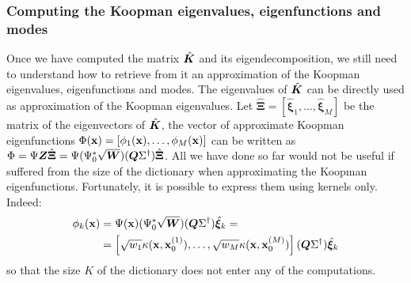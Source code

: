 \subsubsection{Computing the Koopman eigenvalues, eigenfunctions and modes}
Once we have computed the matrix $\hat{\vb*{K}}$ and its eigendecomposition, we still need to understand how to retrieve from it an approximation of the Koopman eigenvalues, eigenfunctions and modes. The eigenvalues of $\hat{\vb*{K}}$ can be directly used as approximation of the Koopman eigenvalues. Let $\hat{\bm{\Xi}} = \left[\hat{\bm{\xi}}_1,\dots,\hat{\bm{\xi}}_M\right]$ be the matrix of the eigenvectors of $\hat{\vb*{K}}$, the vector of approximate Koopman eigenfunctions $\Phi(\vb{x}) = \left[\phi_1(\vb{x}), \dots, \phi_M(\vb{x})\right]$ can be written as $\Phi = \Psi\vb*{Z}\hat{\bm{\Xi}} = \Psi (\Psi_0^*\sqrt{\vb*{W}})(\vb*{Q}\Sigma^{\dagger}) \hat{\bm{\Xi}}$. All we have done so far would not be useful if suffered from the size of the dictionary when approximating the Koopman eigenfunctions. Fortunately, it is possible to express them using kernels only. Indeed:
\begin{equation}
    \label{kernel_eigenfunctions}
    \begin{split}
        \phi_k(\vb{x}) &= \Psi(\vb{x}) (\Psi_0^*\sqrt{\vb*{W}})(\vb*{Q}\Sigma^{\dagger}) \hat{\bm{\xi}}_k =\\
        &= \left[\sqrt{w_1} \kappa(\vb{x}, \vb{x}_0^{(1)}), \dots, \sqrt{w_M} \kappa(\vb{x}, \vb{x}_0^{(M)})\right](\vb*{Q}\Sigma^{\dagger}) \hat{\bm{\xi}}_k
    \end{split}
\end{equation}
so that the size $K$ of the dictionary does not enter any of the computations.

